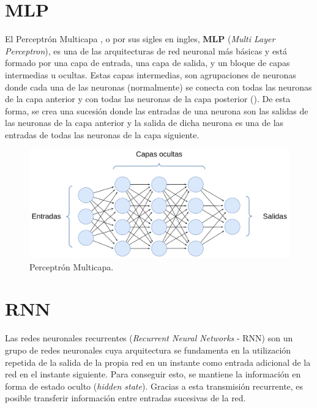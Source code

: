
\section{MLP}
El Perceptrón Multicapa \cite{perceptronmulti}, o por sus sigles en ingles, \textbf{MLP} (\textit{Multi Layer Perceptron}), es una de las arquitecturas de red neuronal más básicas y está formado por una capa de entrada, una capa de salida, y un bloque de capas intermedias u ocultas. Estas capas intermedias, son agrupaciones de neuronas donde cada una de las neuronas (normalmente) se conecta con todas las neuronas de la capa anterior y con todas las neuronas de la capa posterior (). De esta forma, se crea una sucesión donde las entradas de una neurona son las salidas de las neuronas de la capa anterior y la salida de dicha neurona es una de las entradas de todas las neuronas de la capa siguiente. 

\begin{figure}[H]
\centering
\includegraphics[width=0.8\linewidth]{imagenes/mlp.png} 
\captionsetup{width=.8\linewidth}
\caption{Perceptrón Multicapa.}
\label{fig:mlp}
\end{figure}

\section{RNN}
Las redes neuronales recurrentes (\textit{Recurrent Neural Networks} - RNN) son un grupo de redes neuronales cuya arquitectura se fundamenta en la utilización repetida de la salida de la propia red en un instante como entrada adicional de la red en el instante siguiente. Para conseguir esto, se mantiene la información en forma de estado oculto (\textit{hidden state}). Gracias a esta transmisión recurrente, es posible transferir información entre entradas sucesivas de la red.

